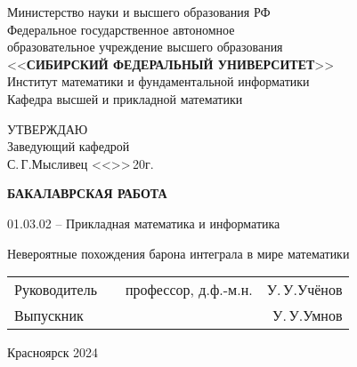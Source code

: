 \begin{titlepage}
\begin{center}
Министерство науки и высшего образования РФ\\
Федеральное государственное автономное \\
образовательное учреждение высшего образования\\
<<\textbf{СИБИРСКИЙ ФЕДЕРАЛЬНЫЙ УНИВЕРСИТЕТ}>> \\
Институт математики и фундаментальной информатики\\
Кафедра высшей и прикладной математики
\end{center}
\vspace{5mm}

\begin{flushright}
	\begin{minipage}{0.4\textwidth}
	УТВЕРЖДАЮ\\
	Заведующий кафедрой\\
	\underline{\hspace{1.5cm}}\quad С.\,Г.\;Мысливец
	<<\underline{\hspace{1cm}}>>\;\underline{\hspace{2cm}}\,20\underline{\hspace{0.75cm}}г.
	\end{minipage}	
\end{flushright}
\vspace{5mm}

\begin{center}

\textbf{БАКАЛАВРСКАЯ РАБОТА}

\vspace{3mm}
01.03.02 -- Прикладная математика и информатика
\vspace{3mm}

Невероятные похождения барона интеграла в мире математики
 \end{center}
\vspace{5mm}

\vspace*{\fill}
\begin{center}
\begin{tabular}{lccr}
	Руководитель & \underline{\hspace{2cm}} & профессор, д.ф.-м.н. & У.\,У.\;Учёнов\\
	Выпускник & \underline{\hspace{2cm}} & 						   & У.\,У.\;Умнов
\end{tabular}
\end{center}
\vspace*{\fill}

\begin{center}

{Красноярск 2024}

\end{center}
\end{titlepage}
